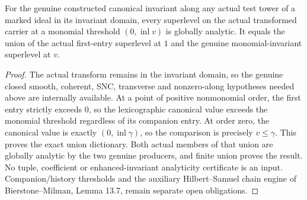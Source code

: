 \begin{theorem}
\label{hir:canonical-monomial-threshold-global-analytic}
\leanok
For the genuine constructed canonical invariant along any actual test
tower of a marked ideal in its invariant domain, every superlevel on
the actual transformed carrier at a monomial threshold $(0,\operatorname{inl}v)$
is globally analytic. It equals the union of the actual first-entry
superlevel at $1$ and the genuine monomial-invariant superlevel at $v$.
\end{theorem}
\begin{proof}
The actual transform remains in the invariant domain, so the genuine
closed smooth, coherent, SNC, transverse and nonzero-along hypotheses
needed above are internally available. At a point of positive nonmonomial
order, the first entry strictly exceeds $0$, so the lexicographic canonical
value exceeds the monomial threshold regardless of its companion entry.
At order zero, the canonical value is exactly $(0,\operatorname{inl}\gamma)$,
so the comparison is precisely $v\le\gamma$. This proves the exact union
dictionary. Both actual members of that union are globally analytic by
the two genuine producers, and finite union proves the result. No tuple,
coefficient or enhanced-invariant analyticity certificate is an input.
Companion/history thresholds and the auxiliary Hilbert--Samuel chain
engine of Bierstone--Milman, Lemma 13.7, remain separate open obligations.
\end{proof}
